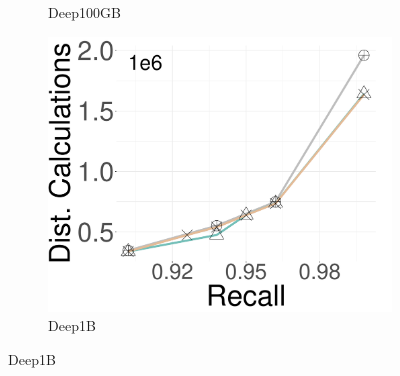 \begin{figure}[ht]
\begin{subfigure}[b]{0.28\textwidth}
                \caption{Deep100GB}
        \label{fig:SWBsearch:_Time}
    \end{subfigure}
    \hspace{0.4cm}
             \begin{subfigure}[b]{0.28\textwidth}
                 \captionsetup{justification=centering}
	\centering	
                \includegraphics[width=\textwidth]{../img/oigas/SWB/search/1B/deep_DC.pdf}
        \caption{Deep1B}
        \label{fig:SWBsearch:_Time}
    \end{subfigure}


\end{figure}
